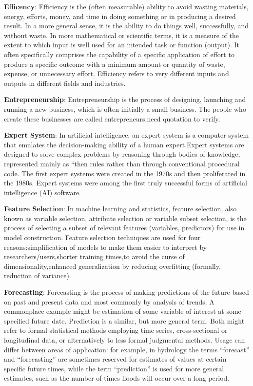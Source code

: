 \documentclass[b5paper,]{book}
\theoremstyle{definition}
\theoremstyle{definition}
\theoremstyle{definition}
\theoremstyle{remark}
\begin{document}
\textbf{Efficency}: Efficiency is the (often measurable) ability to
avoid wasting materials, energy, efforts, money, and time in doing
something or in producing a desired result. In a more general sense, it
is the ability to do things well, successfully, and without waste. In
more mathematical or scientific terms, it is a measure of the extent to
which input is well used for an intended task or function (output). It
often specifically comprises the capability of a specific application of
effort to produce a specific outcome with a minimum amount or quantity
of waste, expense, or unnecessary effort. Efficiency refers to very
different inputs and outputs in different fields and industries.

\textbf{Entrepreneurship}: Entrepreneurship is the process of designing,
launching and running a new business, which is often initially a small
business. The people who create these businesses are called
entrepreneurs.need quotation to verify.

\textbf{Expert System}: In artificial intelligence, an expert system is
a computer system that emulates the decision-making ability of a human
expert.Expert systems are designed to solve complex problems by
reasoning through bodies of knowledge, represented mainly as ``then
rules rather than through conventional procedural code. The first expert
systems were created in the 1970s and then proliferated in the 1980s.
Expert systems were among the first truly successful forms of artificial
intelligence (AI) software.

\textbf{Feature Selection}: In machine learning and statistics, feature
selection, also known as variable selection, attribute selection or
variable subset selection, is the process of selecting a subset of
relevant features (variables, predictors) for use in model construction.
Feature selection techniques are used for four reasons:simplification of
models to make them easier to interpret by researchers/users,shorter
training times,to avoid the curse of dimensionality,enhanced
generalization by reducing overfitting (formally, reduction of
variance).

\textbf{Forecasting}: Forecasting is the process of making predictions
of the future based on past and present data and most commonly by
analysis of trends. A commonplace example might be estimation of some
variable of interest at some specified future date. Prediction is a
similar, but more general term. Both might refer to formal statistical
methods employing time series, cross-sectional or longitudinal data, or
alternatively to less formal judgmental methods. Usage can differ
between areas of application: for example, in hydrology the terms
``forecast'' and ``forecasting'' are sometimes reserved for estimates of
values at certain specific future times, while the term ``prediction''
is used for more general estimates, such as the number of times floods
will occur over a long period.
\end{document}
